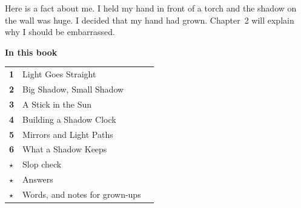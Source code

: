 \begin{multix}[hmm]\multixbot[hmm]\tcblower
Here is a fact about me. I held my hand in front of a torch and the shadow on the wall was huge. I decided that my hand had grown. Chapter~2 will explain why I should be embarrassed.
\end{multix}
\clearpage

\thispagestyle{plain}
{\sans\bfseries\LARGE\color{ink} In this book}\par\vspace{0.2cm}
{\sans\large
\begin{tabular}{@{}p{0.9cm}p{7.6cm}r@{}}
\textcolor{tangerine}{\bfseries 1} & Light Goes Straight & \pageref{ch1}\\[3pt]
\textcolor{tangerine}{\bfseries 2} & Big Shadow, Small Shadow & \pageref{ch2}\\[3pt]
\textcolor{tangerine}{\bfseries 3} & A Stick in the Sun & \pageref{ch3}\\[3pt]
\textcolor{tangerine}{\bfseries 4} & Building a Shadow Clock & \pageref{ch4}\\[3pt]
\textcolor{tangerine}{\bfseries 5} & Mirrors and Light Paths & \pageref{ch5}\\[3pt]
\textcolor{tangerine}{\bfseries 6} & What a Shadow Keeps & \pageref{ch6}\\[3pt]
\textcolor{sky}{\bfseries $\star$} & Slop check & \pageref{slop}\\[3pt]
\textcolor{sky}{\bfseries $\star$} & Answers & \pageref{answers}\\[3pt]
\textcolor{sky}{\bfseries $\star$} & Words, and notes for grown-ups & \pageref{notes}\\
\end{tabular}}

